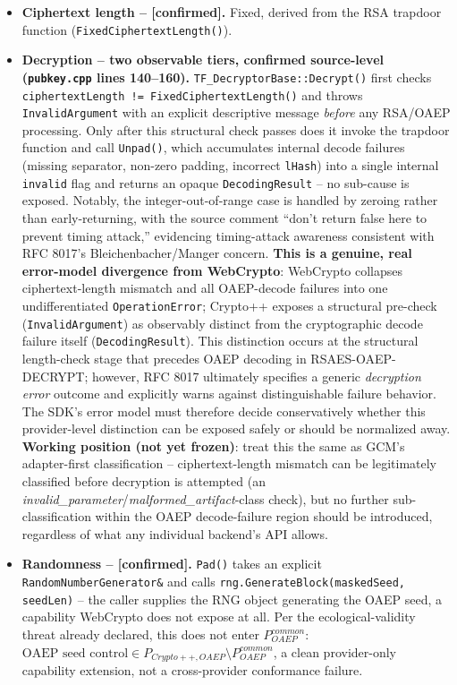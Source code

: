 \documentclass[11pt,a4paper]{article}
\begin{document}
\begin{itemize}
\item \textbf{Ciphertext length -- [confirmed].} Fixed, derived from the RSA trapdoor function (\texttt{FixedCiphertextLength()}).
\item \textbf{Decryption -- two observable tiers, confirmed source-level (\texttt{pubkey.cpp} lines 140--160).} \texttt{TF\_DecryptorBase::Decrypt()} first checks \texttt{ciphertextLength != FixedCiphertextLength()} and throws \texttt{InvalidArgument} with an explicit descriptive message \emph{before} any RSA/OAEP processing. Only after this structural check passes does it invoke the trapdoor function and call \texttt{Unpad()}, which accumulates internal decode failures (missing separator, non-zero padding, incorrect \texttt{lHash}) into a single internal \texttt{invalid} flag and returns an opaque \texttt{DecodingResult} -- no sub-cause is exposed. Notably, the integer-out-of-range case is handled by zeroing rather than early-returning, with the source comment ``don't return false here to prevent timing attack,'' evidencing timing-attack awareness consistent with RFC 8017's Bleichenbacher/Manger concern. \textbf{This is a genuine, real error-model divergence from WebCrypto}: WebCrypto collapses ciphertext-length mismatch and all OAEP-decode failures into one undifferentiated \texttt{OperationError}; Crypto++ exposes a structural pre-check (\texttt{InvalidArgument}) as observably distinct from the cryptographic decode failure itself (\texttt{DecodingResult}). This distinction occurs at the structural length-check stage that precedes OAEP decoding in RSAES-OAEP-DECRYPT; however, RFC 8017 ultimately specifies a generic \emph{decryption error} outcome and explicitly warns against distinguishable failure behavior. The SDK's error model must therefore decide conservatively whether this provider-level distinction can be exposed safely or should be normalized away. \textbf{Working position (not yet frozen)}: treat this the same as GCM's adapter-first classification -- ciphertext-length mismatch can be legitimately classified before decryption is attempted (an \emph{invalid\_parameter}/\emph{malformed\_artifact}-class check), but no further sub-classification within the OAEP decode-failure region should be introduced, regardless of what any individual backend's API allows.
\item \textbf{Randomness -- [confirmed].} \texttt{Pad()} takes an explicit \texttt{RandomNumberGenerator\&} and calls \texttt{rng.GenerateBlock(maskedSeed, seedLen)} -- the caller supplies the RNG object generating the OAEP seed, a capability WebCrypto does not expose at all. Per the ecological-validity threat already declared, this does not enter $P_{OAEP}^{common}$: $\text{OAEP seed control} \in P_{Crypto++,OAEP} \setminus P_{OAEP}^{common}$, a clean provider-only capability extension, not a cross-provider conformance failure.

\end{itemize}
\end{document}
